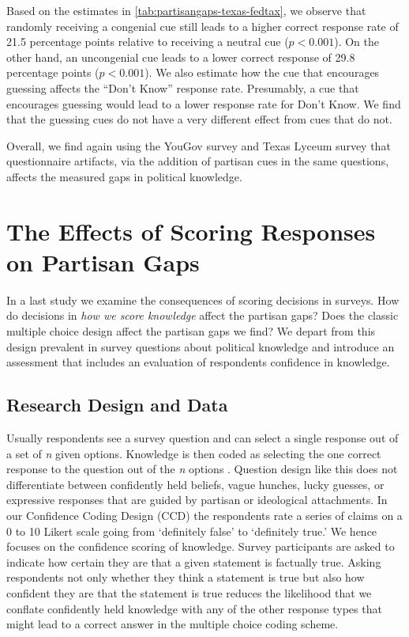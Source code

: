 \documentclass[12pt, letterpaper]{article}
\begin{document}
Based on the estimates in \cref{tab:partisangaps-texas-fedtax}, we observe that randomly receiving a congenial cue still leads to a higher correct response rate of 21.5 percentage points relative to receiving a neutral cue ($p<0.001$). On the other hand, an uncongenial cue leads to a lower correct response of 29.8 percentage points ($p<0.001$).
We also estimate how the cue that encourages guessing affects the ``Don't Know'' response rate. Presumably, a cue that encourages guessing would lead to a lower response rate for Don't Know. We find that the guessing cues do not have a very different effect from cues that do not. 

Overall, we find again using the YouGov survey and Texas Lyceum survey that questionnaire artifacts, via the addition of partisan cues in the same questions, affects the measured gaps in political knowledge. 



\section*{The Effects of Scoring Responses on Partisan Gaps}
\label{sec:confidence_coding}

In a last study we examine the consequences of scoring decisions in surveys. How do decisions in \emph{how we score knowledge} affect the partisan gaps? Does the classic multiple choice design affect the partisan gaps we find? We depart from this design prevalent in survey questions about political knowledge and introduce an assessment that includes an evaluation of respondents confidence in knowledge.


\subsection*{Research Design and Data}\label{sec:data3}

Usually respondents see a survey question and can select a single response out of a set of \emph{n} given options. Knowledge is then coded as selecting the one correct response to the question out of the \emph{n} options \citep[see, for example,][]{plescia2021enemy}. Question design like this does not differentiate between confidently held beliefs, vague hunches, lucky guesses, or expressive responses that are guided by partisan or ideological attachments. In our Confidence Coding Design (CCD) the respondents rate a series of claims on a 0 to 10 Likert scale going from `definitely false' to `definitely true.' We hence focuses on the confidence scoring of knowledge. Survey participants are asked to indicate how certain they are that a given statement is factually true. Asking respondents not only whether they think a statement is true but also how confident they are that the statement is true reduces the likelihood that we conflate confidently held knowledge with any of the other response types that might lead to a correct answer in the multiple choice coding scheme.
\end{document}
